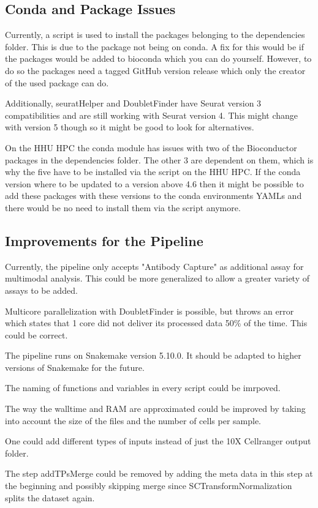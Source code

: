 \subsection{Conda and Package Issues}
Currently, a script is used to install the packages belonging to the dependencies folder. This is due to the package not being on conda. A fix for this would be if the packages would be added to bioconda which you can do yourself. However, to do so the packages need a tagged GitHub version release which only the creator of the used package can do.

Additionally, seuratHelper and DoubletFinder have Seurat version 3 compatibilities and are still working with Seurat version 4. This might change with version 5 though so it might be good to look for alternatives.

On the HHU HPC the conda module has issues with two of the Bioconductor packages in the dependencies folder. The other 3 are dependent on them, which is why the five have to be installed via the script on the HHU HPC. If the conda version where to be updated to a version above 4.6 then it might be possible to add these packages with these versions to the conda environments YAMLs and there would be no need to install them via the script anymore.

\subsection{Improvements for the Pipeline}
Currently, the pipeline only accepts "Antibody Capture" as additional assay for multimodal analysis. This could be more generalized to allow a greater variety of assays to be added.

Multicore parallelization with DoubletFinder is possible, but throws an error which states that 1 core did not deliver its processed data 50\% of the time. This could be correct.

The pipeline runs on Snakemake version 5.10.0. It should be adapted to higher versions of Snakemake for the future.

The naming of functions and variables in every script could be imrpoved.

The way the walltime and RAM are approximated could be improved by taking into account the size of the files and the number of cells per sample.

One could add different types of inputs instead of just the 10X Cellranger output folder.

The step addTPsMerge could be removed by adding the meta data in this step at the beginning and possibly skipping merge since SCTransformNormalization splits the dataset again.

